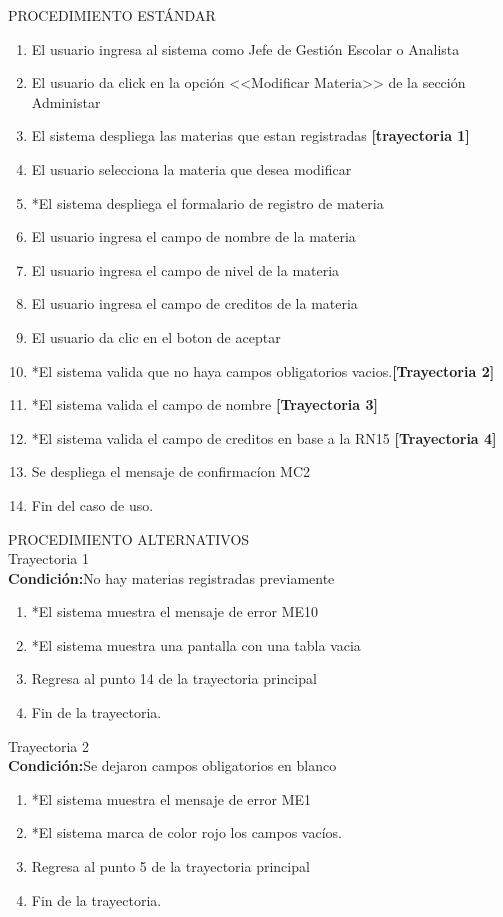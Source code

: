 \vspace*{1cm}
\noindent
\Large{PROCEDIMIENTO ESTÁNDAR}
\large{}
\begin{enumerate}
    \item El usuario ingresa al sistema como Jefe de Gestión Escolar o Analista
    \item El usuario da click en la opción <<Modificar Materia>> de la sección Administar
    \item El sistema despliega las materias que estan registradas \textbf{[trayectoria 1]}
    \item El usuario selecciona la materia que desea modificar 
    \item *El sistema despliega el formalario de registro de materia
    \item El usuario ingresa el campo de nombre de la materia
    \item El usuario ingresa el campo de nivel de la materia
     \item El usuario ingresa el campo de creditos de la materia
    \item El usuario da clic en el boton de aceptar
    \item *El sistema valida que no haya campos obligatorios vacios.\textbf{[Trayectoria 2]} 
    \item *El sistema valida el campo de nombre \textbf{[Trayectoria 3]} 
    \item *El sistema valida el campo de creditos en base a la RN15 \textbf{[Trayectoria 4]}
    \item Se despliega el mensaje de confirmacíon MC2
    \item Fin del caso de uso.
\end{enumerate}
\Large{PROCEDIMIENTO ALTERNATIVOS}\\

\large{Trayectoria 1}\\
\textbf{Condición:}No hay materias registradas previamente
\large{}
\begin{enumerate}
    \item *El sistema muestra el mensaje de error ME10
    \item *El sistema muestra una pantalla con una tabla vacia
    \item Regresa al punto 14 de la trayectoria principal
    \item Fin de la trayectoria.
\end{enumerate}

\large{Trayectoria 2}\\
\textbf{Condición:}Se dejaron campos obligatorios en blanco
\large{}
\begin{enumerate}
    \item *El sistema muestra el mensaje de error ME1
    \item *El sistema marca de color rojo los campos vacíos.
    \item Regresa al punto 5 de la trayectoria principal
    \item Fin de la trayectoria.
\end{enumerate}

